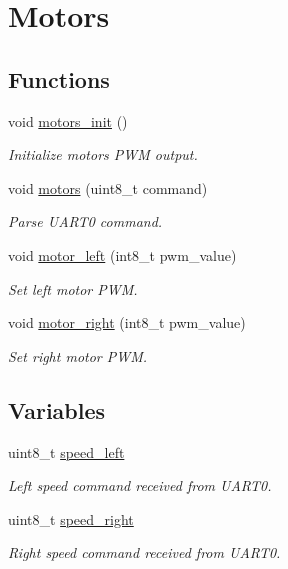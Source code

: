 \hypertarget{group__motors}{}\section{Motors}
\label{group__motors}
\subsection*{Functions}
\begin{DoxyCompactItemize}
\item 
void \hyperlink{group__motors_gad522af7d5cf6fcbf8e873cb7a91df8f3}{motors\+\_\+init} ()
\begin{DoxyCompactList}\small\item\em Initialize motors P\+W\+M output. \end{DoxyCompactList}\item 
void \hyperlink{group__motors_ga2974c2cf5e3983d657ff575f24ed8854}{motors} (uint8\+\_\+t command)
\begin{DoxyCompactList}\small\item\em Parse U\+A\+R\+T0 command. \end{DoxyCompactList}\item 
void \hyperlink{group__motors_gae344f79e4ba9b2f8acaa0b20080c2c07}{motor\+\_\+left} (int8\+\_\+t pwm\+\_\+value)
\begin{DoxyCompactList}\small\item\em Set left motor P\+W\+M. \end{DoxyCompactList}\item 
void \hyperlink{group__motors_ga8726596db4afe2d27c7a6dec5d650b8e}{motor\+\_\+right} (int8\+\_\+t pwm\+\_\+value)
\begin{DoxyCompactList}\small\item\em Set right motor P\+W\+M. \end{DoxyCompactList}\end{DoxyCompactItemize}
\subsection*{Variables}
\begin{DoxyCompactItemize}
\item 
\hypertarget{group__motors_ga04074458bb5888a6503c985940b0047a}{}uint8\+\_\+t \hyperlink{group__motors_ga04074458bb5888a6503c985940b0047a}{speed\+\_\+left}\label{group__motors_ga04074458bb5888a6503c985940b0047a}

\begin{DoxyCompactList}\small\item\em Left speed command received from U\+A\+R\+T0. \end{DoxyCompactList}\item 
\hypertarget{group__motors_ga163497f8cd668bb915026eb9a06ca129}{}uint8\+\_\+t \hyperlink{group__motors_ga163497f8cd668bb915026eb9a06ca129}{speed\+\_\+right}\label{group__motors_ga163497f8cd668bb915026eb9a06ca129}

\begin{DoxyCompactList}\small\item\em Right speed command received from U\+A\+R\+T0. \end{DoxyCompactList}\end{DoxyCompactItemize}


